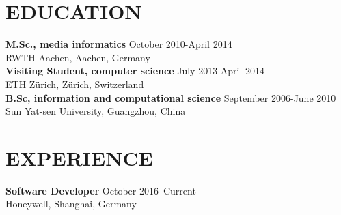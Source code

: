 \documentclass[margin, 10pt]{res} %
\begin{document}
\begin{resume}
\begin{CJK}{UTF8}{gbsn}

 



\section{EDUCATION}
\textbf{M.Sc., media informatics} \hfill October 2010-April 2014 \\
RWTH Aachen, Aachen, Germany \\
\textbf{Visiting Student, computer science} \hfill July 2013-April 2014\\
ETH Zürich, Zürich, Switzerland   \\
\textbf{B.Sc, information and computational science} \hfill September 2006-June 2010\\
Sun Yat-sen University, Guangzhou, China
 
 
\section{EXPERIENCE}

\textbf{Software Developer} \hfill October 2016–Current \\
Honeywell, Shanghai, Germany 


\end{CJK}
\end{resume}
\end{document}

